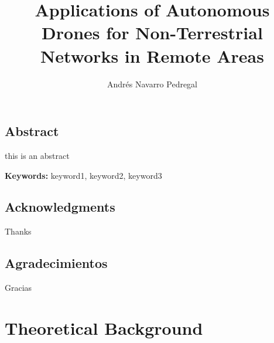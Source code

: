 \documentclass[oneside, 12pt, a4paper]{book}
\title{Applications of Autonomous Drones for Non-Terrestrial Networks in Remote Areas}
\author{Andrés Navarro Pedregal}
\begin{document}

\frontmatter
\maketitle

\blankpage%
\chapter*{Abstract}

this is an abstract

\textbf{Keywords:} keyword1, keyword2, keyword3

\blankpage%

\chapter*{Acknowledgments}
\begingroup
\let\clearpage\relax %

Thanks

\chapter*{Agradecimientos}

Gracias

\endgroup

\blankpage%

\renewcommand{\contentsname}{Table of Contents}
\tableofcontents

\blankpage%

\listoffigures

\blankpage%

\listoftables

\blankpage%

\printglossary[type=\acronymtype,style=long, title=LIST OF ACROYNMS]

\blankpage%

\mainmatter%








\part{Theoretical Background}
\end{document}
